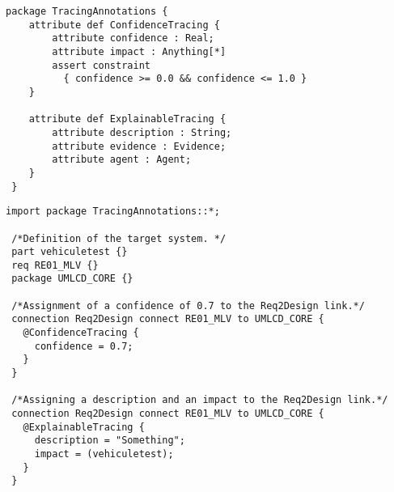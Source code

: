 
\begin{center}
\begin{lstlisting}[caption={Definition of a datatype dedicated to traceability (partial listing).},
label=lst:featurelibrary1,
style=mystylesysml,
linewidth=15cm,
xleftmargin=2.2cm,
morekeywords={part,filter}]
 package TracingAnnotations {
	attribute def ConfidenceTracing {
		attribute confidence : Real;
		attribute impact : Anything[*]
		assert constraint 
		  { confidence >= 0.0 && confidence <= 1.0 } 
	}
	 
	attribute def ExplainableTracing {
		attribute description : String;
		attribute evidence : Evidence;
		attribute agent : Agent;
	}  
 }
\end{lstlisting}
\end{center}  

\begin{center}
\begin{lstlisting}[caption={Use of metadata features for traceability},
label=lst:featurelibrary2,
style=mystylesysml,
frame=shadowbox,
rulesepcolor=\color{blue},
linewidth=15cm,
xleftmargin=2.2cm,
morekeywords={confidence,description,evidence,impact, part, req,package}]
 import package TracingAnnotations::*;

 /*Definition of the target system. */
 part vehiculetest {}
 req RE01_MLV {}
 package UMLCD_CORE {}

 /*Assignment of a confidence of 0.7 to the Req2Design link.*/
 connection Req2Design connect RE01_MLV to UMLCD_CORE {
   @ConfidenceTracing {
     confidence = 0.7;
   }
 }
 
 /*Assigning a description and an impact to the Req2Design link.*/
 connection Req2Design connect RE01_MLV to UMLCD_CORE {
   @ExplainableTracing {
     description = "Something";
     impact = (vehiculetest);
   }
 }
 
\end{lstlisting}
\end{center}

